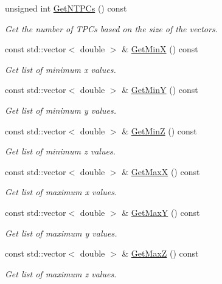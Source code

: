 \begin{DoxyCompactItemize}
unsigned int \hyperlink{classcalib_1_1Geometry_a549443a1465d733b963af16b523d9582}{Get\-N\-T\-P\-Cs} () const 
\begin{DoxyCompactList}\small\item\em Get the number of T\-P\-Cs based on the size of the vectors. \end{DoxyCompactList}\item 
const std\-::vector$<$ double $>$ \& \hyperlink{classcalib_1_1Geometry_a6ba03d84d6ad4dad78d32aa18014ab13}{Get\-Min\-X} () const 
\begin{DoxyCompactList}\small\item\em Get list of minimum x values. \end{DoxyCompactList}\item 
const std\-::vector$<$ double $>$ \& \hyperlink{classcalib_1_1Geometry_ac2cbc474867079e863652c9001dac297}{Get\-Min\-Y} () const 
\begin{DoxyCompactList}\small\item\em Get list of minimum y values. \end{DoxyCompactList}\item 
const std\-::vector$<$ double $>$ \& \hyperlink{classcalib_1_1Geometry_a408ff02bdcc8ba992e64b75613a8633f}{Get\-Min\-Z} () const 
\begin{DoxyCompactList}\small\item\em Get list of minimum z values. \end{DoxyCompactList}\item 
const std\-::vector$<$ double $>$ \& \hyperlink{classcalib_1_1Geometry_a82cd39f3f4a8d97b5e2ab94183e45745}{Get\-Max\-X} () const 
\begin{DoxyCompactList}\small\item\em Get list of maximum x values. \end{DoxyCompactList}\item 
const std\-::vector$<$ double $>$ \& \hyperlink{classcalib_1_1Geometry_af2900f1046eded6ce14bd64d78ca8de5}{Get\-Max\-Y} () const 
\begin{DoxyCompactList}\small\item\em Get list of maximum y values. \end{DoxyCompactList}\item 
const std\-::vector$<$ double $>$ \& \hyperlink{classcalib_1_1Geometry_ad152d46e9241b2318e209b8e3b001d28}{Get\-Max\-Z} () const 
\begin{DoxyCompactList}\small\item\em Get list of maximum z values. \end{DoxyCompactList}\end{DoxyCompactItemize}


